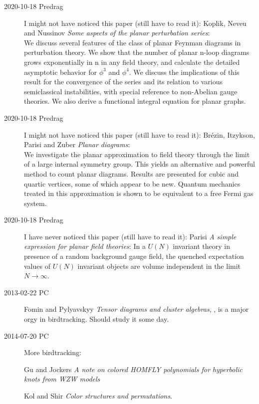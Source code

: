 \begin{description}
\item[2020-10-18 Predrag]
I might not have noticed this paper (still have to read it):
Koplik, Neveu and Nussinov
{{\em Some aspects of the planar perturbation series}}:\\
We discuss several features of the class of planar Feynman diagrams in
perturbation theory. We show that the number of planar n-loop diagrams
grows exponentially in n in any field theory, and calculate the detailed
asymptotic behavior for $\phi^3$ and $\phi^4$. We discuss the
implications of this result for the convergence of the series and its
relation to various semiclassical instabilities, with special reference
to non-Abelian gauge theories. We also derive a functional integral
equation for planar graphs.

\item[2020-10-18 Predrag]
I might not have noticed this paper (still have to read it):
Br{\'{e}}zin, Itzykson, Parisi and Zuber
{{\em Planar diagrams}}:\\
We investigate the planar approximation to field theory through the limit
of a large internal symmetry group. This yields an alternative and
powerful method to count planar diagrams. Results are presented for cubic
and quartic vertices, some of which appear to be new. Quantum mechanics
treated in this approximation is shown to be equivalent to a free Fermi
gas system.

\item[2020-10-18 Predrag]
I have never noticed this paper (still have to read it):
Parisi
{{\em A simple expression for planar field theories}}:
In a $U(N)$ invariant theory in presence of a random background gauge
field, the quenched expectation values of $U(N)$ invariant objects are
volume independent in the limit $N\to\infty$.

\item[2013-02-22 PC] Fomin and Pylyavskyy
{\em Tensor diagrams and cluster algebras}, {},
is a major orgy in birdtracking. Should study it some day.

\item[2014-07-20 PC] More birdtracking:

Gu and Jockers
 {\em A note on colored {HOMFLY} polynomials for hyperbolic knots
      from {WZW} models}

Kol and Shir {\em Color structures and permutations}.


\end{description}
